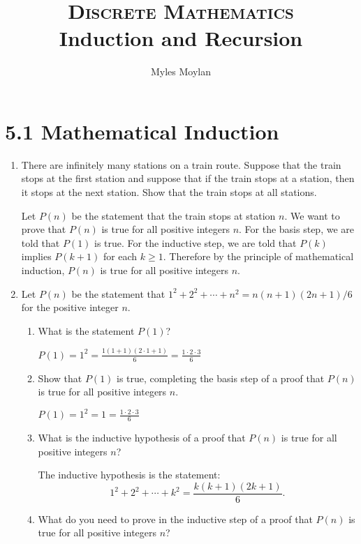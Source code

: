 \documentclass[11pt]{article}
\title{	
	\normalfont \normalsize 
	\textsc{Discrete Mathematics} \\
	\huge Induction and Recursion \\
}
\author{Myles Moylan} %
\date{} %
\begin{document}
	
\maketitle

\section*{\textbf{5.1 Mathematical Induction}}
\begin{enumerate}[label=\textbf{\arabic*.}]
	\item There are infinitely many stations on a train route. Suppose that the train stops at the first station and suppose that if the train stops at a station, then it stops at the next station. Show that the train stops at all stations.
	
	Let $P(n)$ be the statement that the train stops at station $n$. We want to prove that $P(n)$ is true for all positive integers $n$. For the basis step, we are told that $P(1)$ is true. For the inductive step, we are told that $P(k)$ implies $P(k + 1)$ for each $k \geq 1$. Therefore by the principle of mathematical induction, $P(n)$ is true for all positive integers $n$.
	
	\item Let $P(n)$ be the statement that $1^2 + 2^2 + \cdots + n^2 = n(n + 1)(2n + 1) / 6$ for the positive integer $n$.
	
	\begin{enumerate}[label=\textbf{\alph*)}]
		\item What is the statement $P(1)$?
		
		$P(1) = 1^2 = \frac{1(1 + 1)(2 \cdot 1 + 1)}{6} = \frac{1 \cdot 2 \cdot 3}{6}$
		
		\item Show that $P(1)$ is true, completing the basis step of a proof that $P(n)$ is true for all positive integers $n$.
		
		$P(1) = 1^2 = 1 = \frac{1 \cdot 2 \cdot 3}{6}$
		
		\item What is the inductive hypothesis of a proof that $P(n)$ is true for all positive integers $n$?
		
		The inductive hypothesis is the statement: $$1^2 + 2^2 + \cdots + k^2 = \frac{k(k + 1)(2k + 1)}{6}.$$
		
		\item What do you need to prove in the inductive step of a proof that $P(n)$ is true for all positive integers $n$?
		

\end{enumerate}
\end{enumerate}
\end{document}
